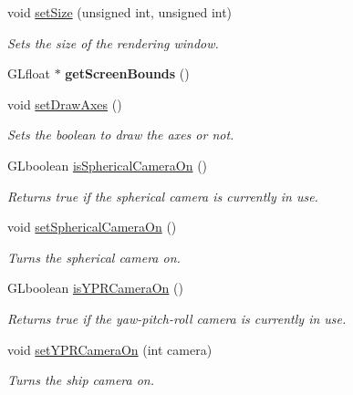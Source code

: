\begin{DoxyCompactItemize}
void \hyperlink{class_graphics_engine_aac1a9cc3d195ed1f28018dffd80dae41}{set\+Size} (unsigned int, unsigned int)
\begin{DoxyCompactList}\small\item\em Sets the size of the rendering window. \end{DoxyCompactList}\item 
\mbox{\label{class_graphics_engine_a95a17b256079f26ca2b73ec3210317d2}} 
G\+Lfloat $\ast$ {\bfseries get\+Screen\+Bounds} ()
\item 
void \hyperlink{class_graphics_engine_ad2db9b0562fcbd96f9cab67a8be451ce}{set\+Draw\+Axes} ()
\begin{DoxyCompactList}\small\item\em Sets the boolean to draw the axes or not. \end{DoxyCompactList}\item 
G\+Lboolean \hyperlink{class_graphics_engine_a45375adf56d4769b0f33206dc760a1f6}{is\+Spherical\+Camera\+On} ()
\begin{DoxyCompactList}\small\item\em Returns true if the spherical camera is currently in use. \end{DoxyCompactList}\item 
\mbox{\label{class_graphics_engine_a82227c52191595cf7ca7aaea82396a01}} 
void \hyperlink{class_graphics_engine_a82227c52191595cf7ca7aaea82396a01}{set\+Spherical\+Camera\+On} ()
\begin{DoxyCompactList}\small\item\em Turns the spherical camera on. \end{DoxyCompactList}\item 
G\+Lboolean \hyperlink{class_graphics_engine_a8ed6b779b8696620241ba701afd6de67}{is\+Y\+P\+R\+Camera\+On} ()
\begin{DoxyCompactList}\small\item\em Returns true if the yaw-\/pitch-\/roll camera is currently in use. \end{DoxyCompactList}\item 
\mbox{\label{class_graphics_engine_a254475bdabd43c5d58e3aef8687754c5}} 
void \hyperlink{class_graphics_engine_a254475bdabd43c5d58e3aef8687754c5}{set\+Y\+P\+R\+Camera\+On} (int camera)
\begin{DoxyCompactList}\small\item\em Turns the ship camera on. \end{DoxyCompactList}\item 

\end{DoxyCompactItemize}
